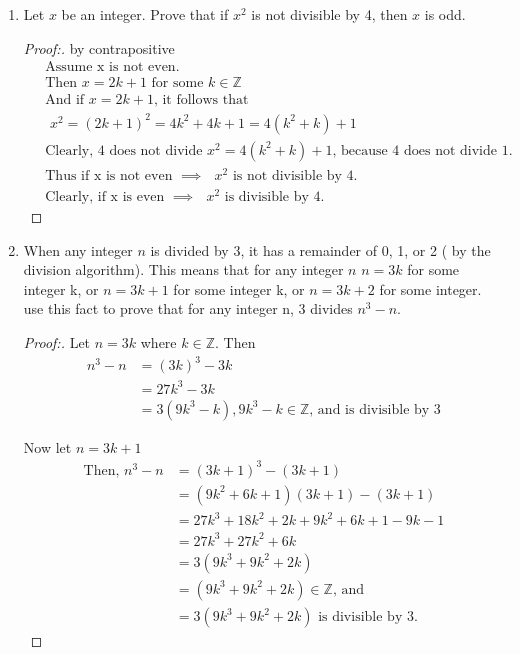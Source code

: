 \documentclass[11pt]{article}
\begin{document}
\begin{enumerate}
    \item Let $x$ be an integer. Prove that if $x^2$ is not divisible by 4, then $x$ is odd.
        \begin{proof}[Proof:\nopunct] by contrapositive
            \begin{align*}
                & \text{ Assume x is not even.} \\
                & \text{ Then $x = 2k + 1$ for some $k\in \mathbb{Z}$ }\\
                & \text{ And if $x = 2k + 1$, it follows that }\\
                & \text{ $x^2 = (2k+1)^2= 4k^2 + 4k + 1 = 4(k^2+k)+1$}\\
                & \text{ Clearly, 4 does not divide $x^2=4(k^2+k)+1$, because 4 does not divide 1.}\\
                & \text{ Thus if x is not even $\implies$ $x^2$ is not divisible by 4.}\\
                & \text{ Clearly, if x is even $\implies$ $x^2$ is divisible by 4.}
            \end{align*}
        \end{proof}
        
    \item When any integer $n$ is divided by 3, it has a remainder of 0, 1, or 2 ( by the division algorithm). This means that for any integer $n$ 
            \newline \newline
             $n = 3k$ for some integer k, or
            \newline
            $n = 3k+1$ for some integer k, or 
            \newline
            $n = 3k+2$ for some integer.
    use this fact to prove that for any integer n, 3 divides $n^3 - n$.
        \begin{proof}[Proof:\nopunct]
         Let $n=3k$ where $k\in \mathbb{Z}$. Then
           \begin{align*}
               n^3-n & = (3k)^3-3k \\ 
                     & =27k^3-3k \\
                     & = 3(9k^3 - k), 9k^3-k \in \mathbb{Z} \text{, and is divisible by 3}
           \end{align*}
           
           \pagebreak
           Now let $n=3k+1$
           \begin{align*}
               \text{Then, } n^3-n & = (3k+1)^3-(3k+1) \\ 
                     & = (9k^2+6k+1)(3k+1)-(3k+1) \\
                     & = 27k^3 + 18k^2+2k+9k^2+6k+1-9k-1 \\
                     & = 27k^3 + 27k^2+6k \\
                     & = 3(9k^3+9k^2+2k) \\
                     & = (9k^3+9k^2+2k) \in \mathbb{Z} \text{, and} \\
                     & = 3(9k^3+9k^2+2k) \text{ is divisible by 3.}
           \end{align*}
           

\end{proof}
\end{enumerate}
\end{document}
